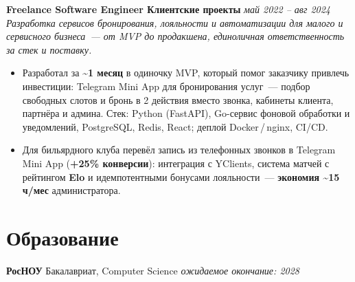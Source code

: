\documentclass[10pt,a4paper]{article}
\begin{document}
\vspace{0.55em}
\textbf{Freelance Software Engineer \textbar{} Клиентские проекты} \hfill \textit{май 2022 -- авг 2024}\\[0.18em]
{\footnotesize\textit{Разработка сервисов бронирования, лояльности и автоматизации для малого и сервисного бизнеса~--- от MVP до продакшена, единоличная ответственность за стек и поставку.}}
\begin{itemize}
  \item Разработал за \textbf{\textasciitilde1 месяц} в одиночку MVP, который помог заказчику привлечь инвестиции: Telegram Mini App для бронирования услуг~--- подбор свободных слотов и бронь в 2 действия вместо звонка, кабинеты клиента, партнёра и админа. Стек: Python (FastAPI), Go-сервис фоновой обработки и уведомлений, PostgreSQL, Redis, React; деплой Docker\,/\,nginx, CI/CD.
  \item Для бильярдного клуба перевёл запись из телефонных звонков в Telegram Mini App (\textbf{+25\% конверсии}): интеграция с YClients, система матчей с рейтингом \textbf{Elo} и идемпотентными бонусами лояльности~--- \textbf{экономия \textasciitilde15 ч/мес} администратора.
\end{itemize}

\section*{Образование}
\textbf{РосНОУ} \textbar{} Бакалавриат, Computer Science \textbar{} \textit{ожидаемое окончание: 2028}\\[0.05em]
\end{document}
